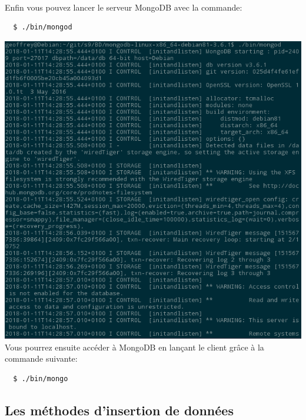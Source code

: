 \documentclass{article}
\begin{document}
  \paragraph{} Enfin vous pouvez lancer le serveur MongoDB avec la commande:
  \begin{lstlisting}
  $ ./bin/mongod
  \end{lstlisting}
  \includegraphics[scale=0.8]{mongodb/lancement_mongo.png}\\
  Vous pourrez ensuite accéder à MongoDB en lançant le client grâce à la commande suivante:
  \begin{lstlisting}
  $ ./bin/mongo
  \end{lstlisting}
  
  
\subsection{Les méthodes d’insertion de données}
\end{document}

